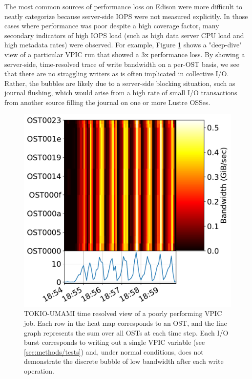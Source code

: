 The most common sources of performance loss on Edison were more difficult to neatly categorize because server-side IOPS were not measured explicitly.  In those cases where performance was poor despite a high coverage factor, many secondary indicators of high IOPS load (such as high data server CPU load and high metadata rates) were observed.  For example, Figure \ref{fig:umami-deepdive} shows a "deep-dive" view of a particular VPIC run that showed a 3x performance loss.  By showing a server-side, time-resolved trace of write bandwidth on a per-OST basis, we see that there are no straggling writers as is often implicated in collective I/O.  Rather, the bubbles are likely due to a server-side blocking situation, such as journal flushing, which would arise from a high rate of small I/O transactions from another source filling the journal on one or more Lustre OSSes.

\begin{figure}[t]
    \centering
    \includegraphics[width=1.0\columnwidth]{figs/deepdive-scratch3-vpic-write_feb24.pdf}
    \caption{TOKIO-UMAMI time resolved view of a poorly performing VPIC job.  Each row in the heat map corresponds to an OST, and the line graph represents the sum over all OSTs at each time step.  Each I/O burst corresponds to writing out a single VPIC variable (see \ref{sec:methods/tests}) and, under normal conditions, does not demonstrate the discrete bubble of low bandwidth after each write operation.}
    \label{fig:umami-deepdive}
\end{figure}

